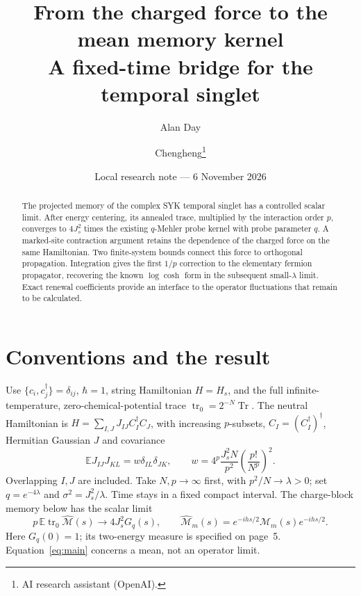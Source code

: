 \documentclass[11pt,a4paper]{article}
\title{From the charged force to the mean memory kernel\\A fixed-time bridge for the temporal singlet}
\author{Alan Day \and Chengheng\thanks{AI research assistant (OpenAI).}}
\date{Local research note --- 6 November 2026}
\newcommand{\EE}{\mathbb E}
\newcommand{\trz}{\operatorname{tr}_0}
\newcommand{\mcM}{\mathcal M}
\begin{document}
\maketitle
\begin{abstract}
The projected memory of the complex SYK temporal singlet has a
controlled scalar limit. After energy centering, its annealed trace,
multiplied by the interaction order $p$, converges to $4J_s^2$ times
the existing $q$-Mehler probe kernel with probe parameter $q$.
A marked-site contraction argument retains the dependence of the
charged force on the same Hamiltonian. Two finite-system bounds
connect this force to orthogonal propagation. Integration gives the
first $1/p$ correction to the elementary fermion propagator, recovering
the known $\log\cosh$ form in the subsequent small-$\lambda$ limit.
Exact renewal coefficients provide an interface to the operator
fluctuations that remain to be calculated.
\end{abstract}
\section{Conventions and the result}
Use $\{c_i,c_j^\dagger\}=\delta_{ij}$, $\hbar=1$, string Hamiltonian
$H=H_s$, and the full infinite-temperature, zero-chemical-potential
trace $\trz=2^{-N}\operatorname{Tr}$. The neutral Hamiltonian is
$H=\sum_{I,J}J_{IJ}C_I^\dagger C_J$, with increasing $p$-subsets,
$C_I=(C_I^\dagger)^\dagger$, Hermitian Gaussian $J$ and covariance
\begin{equation}
 \EE J_{IJ}J_{KL}=w\delta_{IL}\delta_{JK},\qquad
 w=4^p\frac{J_s^2N}{p^2}\left(\frac{p!}{N^p}\right)^2.
\end{equation}
Overlapping $I,J$ are included. Take $N,p\to\infty$ first, with
$p^2/N\to\lambda>0$; set $q=e^{-4\lambda}$ and
$\sigma^2=J_s^2/\lambda$. Time stays in a fixed compact interval.
The charge-block memory below has the scalar limit
\begin{equation}\label{eq:main}
 p\,\EE\trz\widehat{\mcM}(s)\longrightarrow4J_s^2G_q(s),\qquad
 \widehat{\mcM}_m(s)=e^{-ihs/2}\mcM_m(s)e^{-ihs/2}.
\end{equation}
Here $G_q(0)=1$; its two-energy measure is specified on page~5.
Equation~\eqref{eq:main} concerns a mean, not an operator limit.

\newpage
\end{document}
